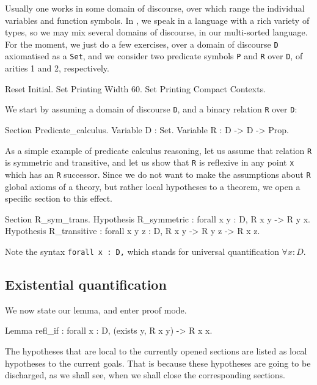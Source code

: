 \documentclass[11pt,a4paper]{book}
\begin{document}
Usually one works in some domain of discourse, over which range the individual
variables and function symbols. In \Coq{}, we speak in a language with a rich
variety of types, so we may mix several domains of discourse, in our
multi-sorted language. For the moment, we just do a few exercises, over a
domain of discourse \verb:D: axiomatised as a \verb:Set:, and we consider two
predicate symbols  \verb:P: and \verb:R: over \verb:D:, of arities
1 and 2, respectively.

\begin{coq_eval}
Reset Initial.
Set Printing Width 60.
Set Printing Compact Contexts.
\end{coq_eval}

We start by assuming a domain of
discourse \verb:D:, and a binary relation \verb:R:  over \verb:D::
\begin{coq_example}
Section Predicate_calculus.
Variable D : Set.
Variable R : D -> D -> Prop.
\end{coq_example}

As a simple example of predicate calculus reasoning, let us assume
that relation \verb:R: is symmetric and transitive, and let us show that
\verb:R: is reflexive in any point \verb:x: which has an \verb:R: successor.
Since we do not want to make the assumptions about \verb:R: global axioms of
a theory, but rather local hypotheses to a theorem, we open a specific
section to this effect.
\begin{coq_example}
Section R_sym_trans.
Hypothesis R_symmetric : forall x y : D, R x y -> R y x.
Hypothesis R_transitive :
    forall x y z : D, R x y -> R y z -> R x z.
\end{coq_example}

Note the syntax \verb+forall x : D,+ which stands for universal quantification
$\forall x : D$.

\subsection{Existential quantification}

We now state our lemma, and enter proof mode.
\begin{coq_example}
Lemma refl_if : forall x : D, (exists y, R x y) -> R x x.
\end{coq_example}

The hypotheses that are local to the currently opened sections
are listed as local hypotheses to the current goals.
That is because these hypotheses are going to be discharged, as
we shall see, when we shall close the corresponding sections.
\end{document}
